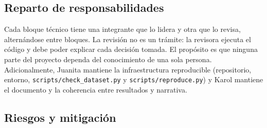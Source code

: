 \documentclass[12pt,a4paper]{article}
\begin{document}
\subsection{Reparto de responsabilidades}

Cada bloque técnico tiene una integrante que lo lidera y otra que lo revisa,
alternándose entre bloques. La revisión no es un trámite: la revisora ejecuta el
código y debe poder explicar cada decisión tomada. El propósito es que ninguna
parte del proyecto dependa del conocimiento de una sola persona. Adicionalmente,
Juanita mantiene la infraestructura reproducible (repositorio, entorno,
\texttt{scripts/check\_dataset.py} y \texttt{scripts/reproduce.py}) y Karol
mantiene el documento y la coherencia entre resultados y narrativa.

\subsection{Riesgos y mitigación}
\end{document}
